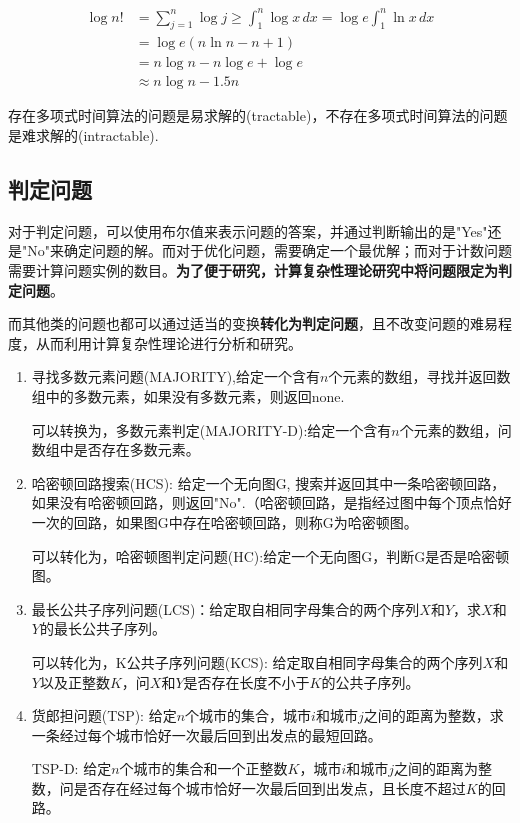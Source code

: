\documentclass[./../main.tex]{subfiles}
\begin{document}
\begin{align*}
\log n! &= \sum_{j=1}^{n}\log j \geq \int_{1}^{n}\log x\,dx = \log e \int_{1}^{n}\ln x\,dx \\
&= \log e (n\ln n - n + 1) \\
&= n\log n - n\log e + \log e \\
&\approx n\log n - 1.5n
\end{align*}

存在多项式时间算法的问题是易求解的(tractable)，不存在多项式时间算法的问题是难求解的(intractable).

\subsection{判定问题}
对于判定问题，可以使用布尔值来表示问题的答案，并通过判断输出的是"Yes"还是"No"来确定问题的解。而对于优化问题，需要确定一个最优解；而对于计数问题需要计算问题实例的数目。\textbf{为了便于研究，计算复杂性理论研究中将问题限定为判定问题}。

而其他类的问题也都可以通过适当的变换\textbf{转化为判定问题}，且不改变问题的难易程度，从而利用计算复杂性理论进行分析和研究。

\begin{enumerate}
    \item 寻找多数元素问题(MAJORITY),给定一个含有$n$个元素的数组，寻找并返回数组中的多数元素，如果没有多数元素，则返回none.

    可以转换为，多数元素判定(MAJORITY-D):给定一个含有$n$个元素的数组，问数组中是否存在多数元素。

    \item 哈密顿回路搜索(HCS): 给定一个无向图G, 搜索并返回其中一条哈密顿回路，如果没有哈密顿回路，则返回"No".（哈密顿回路，是指经过图中每个顶点恰好一次的回路，如果图G中存在哈密顿回路，则称G为哈密顿图。

    可以转化为，哈密顿图判定问题(HC):给定一个无向图G，判断G是否是哈密顿图。
    \item 最长公共子序列问题(LCS)：给定取自相同字母集合的两个序列$X$和$Y$，求$X$和$Y$的最长公共子序列。

    可以转化为，K公共子序列问题(KCS): 给定取自相同字母集合的两个序列$X$和$Y$以及正整数$K$，问$X$和$Y$是否存在长度不小于$K$的公共子序列。

    \item 货郎担问题(TSP): 给定$n$个城市的集合，城市$i$和城市$j$之间的距离为整数，求一条经过每个城市恰好一次最后回到出发点的最短回路。

    TSP-D: 给定$n$个城市的集合和一个正整数$K$，城市$i$和城市$j$之间的距离为整数，问是否存在经过每个城市恰好一次最后回到出发点，且长度不超过$K$的回路。
\end{enumerate}
\end{document}
